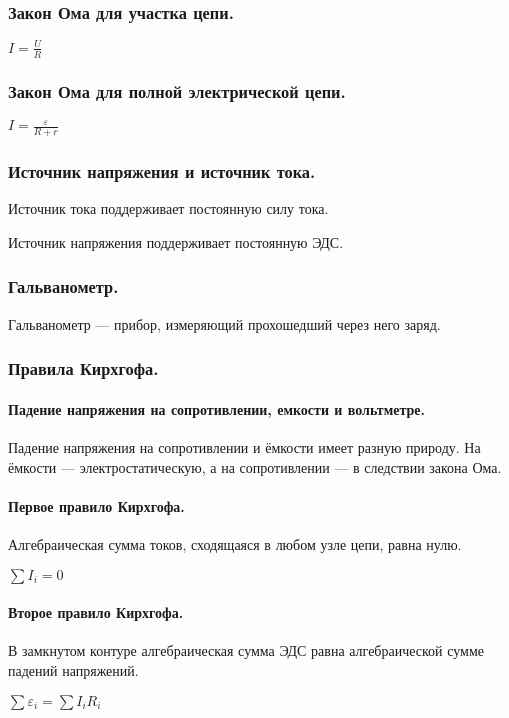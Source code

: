 \documentclass{article}
\begin{document}
        \subsubsection{Закон Ома для участка цепи.}
                \(I = \frac{U}{R}\)
        \subsubsection{Закон Ома для полной электрической цепи.}
                \(I = \frac{\varepsilon}{R + r}\)
        \subsubsection{Источник напряжения и источник тока.}
                Источник тока поддерживает постоянную силу тока.

                Источник напряжения поддерживает постоянную ЭДС.
        \subsubsection{Гальванометр.}
                Гальванометр --- прибор, измеряющий прохошедший через него заряд.
        \subsubsection{Правила Кирхгофа.}
            \paragraph{Падение напряжения на сопротивлении, емкости и вольтметре.}
                Падение напряжения на сопротивлении и ёмкости имеет разную природу. На ёмкости --- электростатическую, а на сопротивлении --- в следствии закона Ома.
            \paragraph{Первое правило Кирхгофа.}
                Алгебраическая сумма токов, сходящаяся в любом узле цепи, равна нулю.
                
                \(\sum{I_i} = 0\)
            \paragraph{Второе правило Кирхгофа.}
                В замкнутом контуре алгебраическая сумма ЭДС равна алгебраической сумме падений напряжений.

                \(\sum{\varepsilon_i} = \sum{I_iR_i}\)
\end{document}
